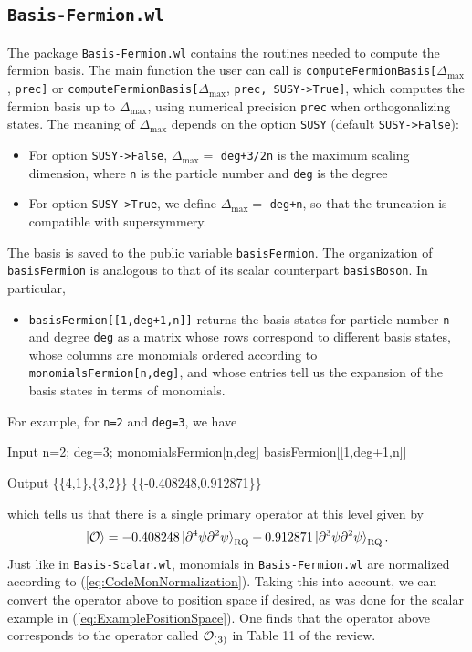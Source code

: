 \documentclass[12pt]{article}
\newcommand{\CO}{{\cal O}}
\newcommand\De\Delta
\newcommand{\p}{\partial}
\newcommand{\Dmax}{\De_{\max}}
\newcommand{\rket}[1]{\ket{#1}_{\rm RQ}}
\begin{document}
\subsection{{\tt Basis-Fermion.wl}}

The package  {\tt Basis-Fermion.wl} contains the routines needed to compute the fermion basis. The main function the user can call is {\tt computeFermionBasis[}$\Delta_{\textrm{max} } $, {\tt prec]} or {\tt computeFermionBasis[}$\Delta_{\textrm{max} } $, {\tt prec, SUSY->True]}, which computes the fermion basis up to $\Dmax$, using numerical precision {\tt prec} when orthogonalizing states. The meaning of $\Dmax$ depends on the option {\tt SUSY} (default {\tt SUSY->False}):
\begin{itemize}
\item For option {\tt SUSY->False}, $\Dmax =$ {\tt deg+3/2n} is  the maximum scaling dimension, where {\tt n} is the particle number and {\tt deg} is the degree  
\item For option {\tt SUSY->True}, we define $\Dmax=$ {\tt deg+n}, so that the truncation is compatible with supersymmery.
\end{itemize}
The basis is saved to the public variable {\tt basisFermion}.  The organization of {\tt basisFermion} is analogous to that of its scalar counterpart {\tt basisBoson}. In particular,
\begin{itemize}
\item {\tt basisFermion[[1,deg+1,n]]} returns the basis states for particle number {\tt n} and degree {\tt deg} as a matrix whose rows correspond to different basis states, whose columns are monomials ordered according to {\tt monomialsFermion[n,deg]}, and whose entries tell us the expansion of the basis states in terms of monomials. 
\end{itemize}
For example, for {\tt n=2} and {\tt deg=3}, we have 
\begin{mmaCell}[moredefined={monomialsFermion,basisFermion}]{Input}
  n=2; deg=3; 
  monomialsFermion[n,deg]
  basisFermion[[1,deg+1,n]]
\end{mmaCell}
\begin{mmaCell}{Output}
  \{\{4,1\},\{3,2\}\}
  \{\{-0.408248,0.912871\}\}
\end{mmaCell}
which tells us that there is a single primary operator at this level given by 
\begin{equation*}
\ket{\CO} = -0.408248 \rket{ \p^4 \psi \p^2\psi } + 0.912871 \rket{ \p^3 \psi \p^2 \psi  }. 
\end{equation*}
Just like in {\tt Basis-Scalar.wl}, monomials in {\tt Basis-Fermion.wl} are normalized according to (\ref{eq:CodeMonNormalization}). Taking this into account, we can convert the operator above to position space if desired, as was done for the scalar example in (\ref{eq:ExamplePositionSpace}). One finds that the operator above corresponds to the operator called $\CO_{(3)}$ in Table 11 of the review. 
\end{document}
